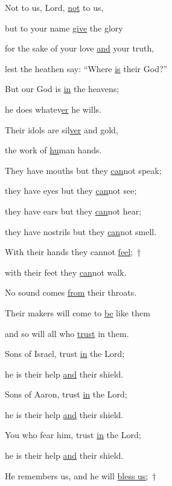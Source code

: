 \noindent Not to us, Lord, \uline{not} to us,~\GreStar{}~\nopagebreak

but to your name \uline{give} the glory

\noindent for the sake of your love \uline{and} your truth,~\GreStar{}~\nopagebreak

lest the heathen say: “Where \uline{is} their God?”



\noindent But our God is \uline{in} the heavens;~\GreStar{}~\nopagebreak

he does whatev\uline{er} he wills.

\noindent Their idols are sil\uline{ver} and gold,~\GreStar{}~\nopagebreak

the work of \uline{hu}man hands.



\noindent They have mouths but they \uline{can}not speak;~\GreStar{}~\nopagebreak

they have eyes but they \uline{can}not see;

\noindent they have ears but they \uline{can}not hear;~\GreStar{}~\nopagebreak

they have nostrils but they \uline{can}not smell.



\noindent With their hands they cannot \uline{feel};~†~\nopagebreak

with their feet they \uline{can}not walk.~\GreStar{}~\nopagebreak

No sound comes \uline{from} their throats.



\noindent Their makers will come to \uline{be} like them~\GreStar{}~\nopagebreak

and so will all who \uline{trust} in them.



\noindent Sons of Israel, trust \uline{in} the Lord;~\GreStar{}~\nopagebreak

he is their help \uline{and} their shield.

\noindent Sons of Aaron, trust \uline{in} the Lord;~\GreStar{}~\nopagebreak

he is their help \uline{and} their shield.



\noindent You who fear him, trust \uline{in} the Lord;~\GreStar{}~\nopagebreak

he is their help \uline{and} their shield.

\noindent He remembers us, and he will \uline{bless us;}~†~\nopagebreak

